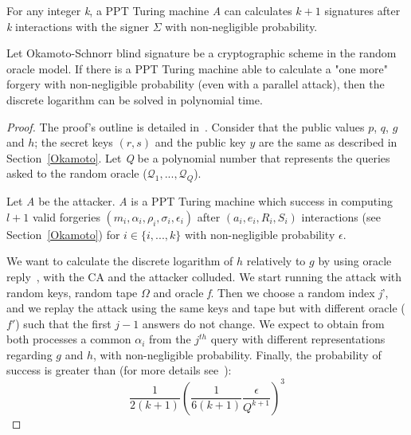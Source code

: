 \documentclass[conference]{llncs}
\begin{document}
\begin{definition}
For any integer \textit{k}, a PPT Turing machine \textit{A} can calculates $k+1$ signatures after \textit{k} interactions with the signer $\Sigma$ with non-negligible probability.  
\end{definition}

\begin{theorem}
Let Okamoto-Schnorr blind signature be a cryptographic scheme in the random oracle model. If there is a PPT Turing machine able to calculate a "one more" forgery with non-negligible probability (even with a parallel attack), then the discrete logarithm can be solved in polynomial time.
\end{theorem}

\begin{proof}
The proof's outline is detailed in~\cite{pointcheval1996provably}.
Consider that the public values $p$, $q$, $g$ and $h$; the secret keys $(r,s)$ and the public key $y$ are the same as described in Section~\ref{Okamoto}. Let \textit{Q} be a polynomial number that represents the queries asked to the random oracle ($\mathcal{Q}_1,...,\mathcal{Q}_Q$).

Let \textit{A} be the attacker. \textit{A} is a PPT Turing machine which success in computing  $l+1$ valid forgeries $(m_i,\alpha_i,\rho_i,\sigma_i,\epsilon_i)$ after $(a_i,e_i,R_i,S_i)$ interactions (see Section~\ref{Okamoto}) for $i\in\{i,...,k\}$ with non-negligible probability $\epsilon$.

We want to calculate the discrete logarithm of $h$ relatively to $g$ by using oracle reply~\cite{10.1007/3-540-68339-9_33}, with the CA and the attacker colluded. We start running the attack with random keys, random tape $\Omega$ and oracle \textit{f}. Then we choose a random index \textit{j}', and we replay the attack using the same keys and tape but with different oracle ($f'$) such that the first $j-1$ answers do not change. We expect to obtain from both processes a common $\alpha_i$ from the $j^{th}$ query with different representations regarding $g$ and $h$, with non-negligible probability. Finally, the probability of success is greater than (for more details see~\cite{pointcheval1996provably}):
\begin{equation}
    \frac{1}{2(k+1)}\left(\frac{1}{6(k+1)}\frac{\epsilon}{Q^{k+1}}\right)^3
\end{equation}
\end{proof}
\end{document}
